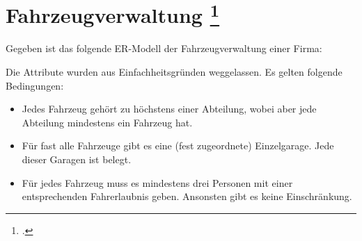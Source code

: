 \documentclass{lehramt-informatik-aufgabe}
\begin{document}

\section{Fahrzeugverwaltung
\footcite[Seite 2-3, Aufgabe 4: Fahrzeugverwaltung]{db:ab:1}}

Gegeben ist das folgende ER-Modell der Fahrzeugverwaltung einer Firma:


\noindent
Die Attribute wurden aus Einfachheitsgründen weggelassen. Es gelten
folgende Bedingungen:

\begin{itemize}

\item Jedes Fahrzeug gehört zu höchstens einer Abteilung, wobei aber
jede Abteilung mindestens ein Fahrzeug hat.

\item Für fast alle Fahrzeuge gibt es eine (fest zugeordnete)
Einzelgarage. Jede dieser Garagen ist belegt.

\item Für jedes Fahrzeug muss es mindestens drei Personen mit einer
entsprechenden Fahrerlaubnis geben. Ansonsten gibt es keine
Einschränkung.
\end{itemize}
\end{document}
